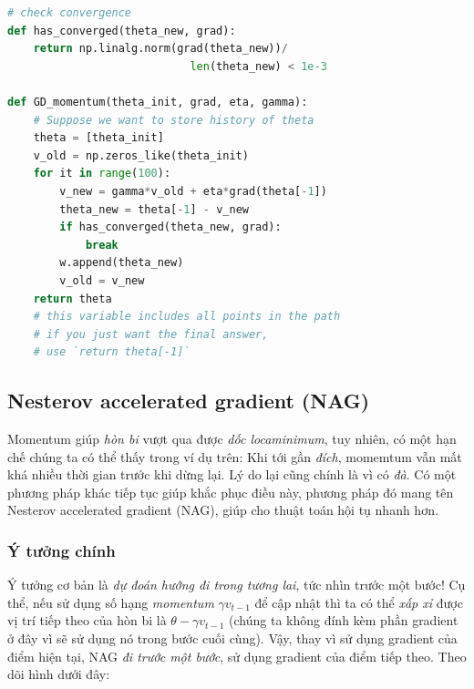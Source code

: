  
\begin{lstlisting}[language=Python]
# check convergence 
def has_converged(theta_new, grad): 
    return np.linalg.norm(grad(theta_new))/ 
                            len(theta_new) < 1e-3 
 
def GD_momentum(theta_init, grad, eta, gamma): 
    # Suppose we want to store history of theta 
    theta = [theta_init] 
    v_old = np.zeros_like(theta_init) 
    for it in range(100): 
        v_new = gamma*v_old + eta*grad(theta[-1]) 
        theta_new = theta[-1] - v_new 
        if has_converged(theta_new, grad): 
            break  
        w.append(theta_new) 
        v_old = v_new 
    return theta  
    # this variable includes all points in the path 
    # if you just want the final answer,  
    # use `return theta[-1]` 
\end{lstlisting}
 
 
\subsection{Nesterov accelerated gradient (NAG)}
 
Momentum giúp \textit{hòn bi} vượt qua được \textit{dốc locaminimum}, tuy nhiên, có một hạn chế chúng ta có thể thấy trong ví dụ trên: Khi tới gần \textit{đích}, momemtum vẫn mất khá nhiều thời gian trước khi dừng lại. Lý do lại cũng chính là vì có \textit{đà}. Có một phương pháp khác tiếp tục giúp khắc phục điều này, phương pháp đó mang tên Nesterov accelerated gradient (NAG), giúp cho thuật toán hội tụ nhanh hơn.  
 
 
\subsubsection{Ý tưởng chính }
 
Ý tưởng cơ bản là \textit{dự đoán hướng đi trong tương lai}, tức nhìn trước một bước! Cụ thể, nếu sử dụng số hạng \textit{momentum} $\gamma v_{t-1}$ để cập nhật thì ta có thể \textit{xấp xỉ} được vị trí tiếp theo của hòn bi là $\theta - \gamma v_{t-1}$ (chúng ta không đính kèm phần gradient ở đây vì sẽ sử dụng nó trong bước cuối cùng). Vậy, thay vì sử dụng gradient của điểm hiện tại, NAG \textit{đi trước một bước}, sử dụng gradient của điểm tiếp theo. Theo dõi hình dưới đây: 
 


